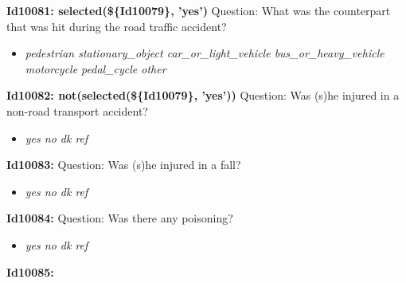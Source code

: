 \documentclass{article}%
\begin{document}
\textbf{Id10081: selected(\$\{Id10079\}, 'yes')\newline%
}%
Question: What was the counterpart that was hit during the road traffic accident?\newline%
%
\begin{itemize}%
\item%
\textit{pedestrian\newline%
 stationary\_object\newline%
 car\_or\_light\_vehicle\newline%
 bus\_or\_heavy\_vehicle\newline%
 motorcycle\newline%
 pedal\_cycle\newline%
 other\newline%
}%
\end{itemize}%
\textbf{Id10082: not(selected(\$\{Id10079\}, 'yes'))\newline%
}%
Question: Was (s)he injured in a non{-}road transport accident?\newline%
%
\begin{itemize}%
\item%
\textit{yes\newline%
 no\newline%
 dk\newline%
 ref\newline%
}%
\end{itemize}%
\textbf{Id10083: \newline%
}%
Question: Was (s)he injured in a fall?\newline%
%
\begin{itemize}%
\item%
\textit{yes\newline%
 no\newline%
 dk\newline%
 ref\newline%
}%
\end{itemize}%
\textbf{Id10084: \newline%
}%
Question: Was there any poisoning?\newline%
%
\begin{itemize}%
\item%
\textit{yes\newline%
 no\newline%
 dk\newline%
 ref\newline%
}%
\end{itemize}%
\textbf{Id10085: \newline%
}%
\end{document}
